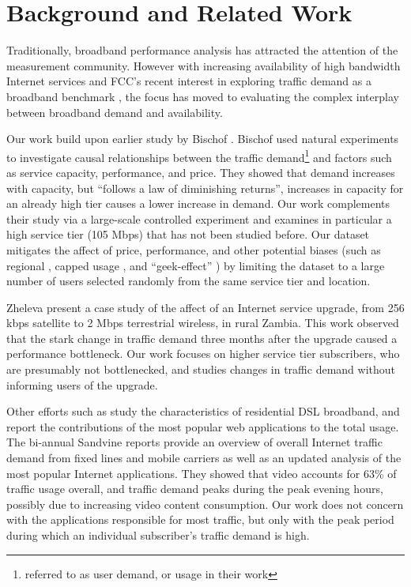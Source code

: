 \section{Background and Related Work}\label{sec:related}

Traditionally, broadband performance analysis has attracted the attention of 
the measurement community. However with increasing availability of high 
bandwidth Internet services and FCC's recent interest in exploring traffic 
demand as a broadband benchmark \cite{fcc2015progress-report}, the focus has 
moved to evaluating the complex interplay between broadband demand and 
availability.

Our work build upon earlier study by Bischof \ea \cite{dasu-imc2014}.
Bischof \ea used natural experiments to investigate causal relationships between 
the traffic demand\footnote{referred to as user demand, or usage in their work} 
and factors such as service capacity, performance, and price. They showed 
that demand increases with capacity, but ``follows a law of diminishing  
returns'', \ie increases in capacity for an already high tier causes a lower 
increase in demand.
Our work complements their study via a large-scale controlled experiment and 
examines in particular a high service tier (105 Mbps) that has not been studied 
before. Our dataset mitigates the affect of price, performance, and other 
potential biases (such as regional \cite{dasu-weather, dasu-region}, capped 
usage \cite{usage-caps}, and ``geek-effect'' \cite{dasu-imc2014}) by limiting 
the dataset to a large number of users selected randomly from the same service 
tier and location.

Zheleva \ea present a case study of the affect of an Internet service 
upgrade, from 256 kbps satellite to 2 Mbps terrestrial wireless, in rural 
Zambia. 
This work observed that the stark change in traffic demand three months after 
the upgrade caused a performance bottleneck. Our work focuses on higher 
service tier subscribers, who are presumably not bottlenecked, and studies 
changes in traffic demand without informing users of the upgrade.

Other efforts such as \cite{imc102-maier} study the characteristics of 
residential DSL broadband, and report the contributions of the most popular 
web applications to the total usage.
The bi-annual Sandvine reports \cite{sandvine2014report1h, 
sandvine2014report2h} provide an overview of overall Internet traffic 
demand from fixed lines and mobile carriers as well as an updated analysis of 
the most popular Internet applications. They showed that video accounts for 63\%
of traffic usage overall, and traffic demand peaks during the peak evening 
hours, possibly due to increasing video content consumption. Our work does not 
concern with the applications responsible for most traffic, but only with the 
peak period during which an individual subscriber's traffic demand is high.

